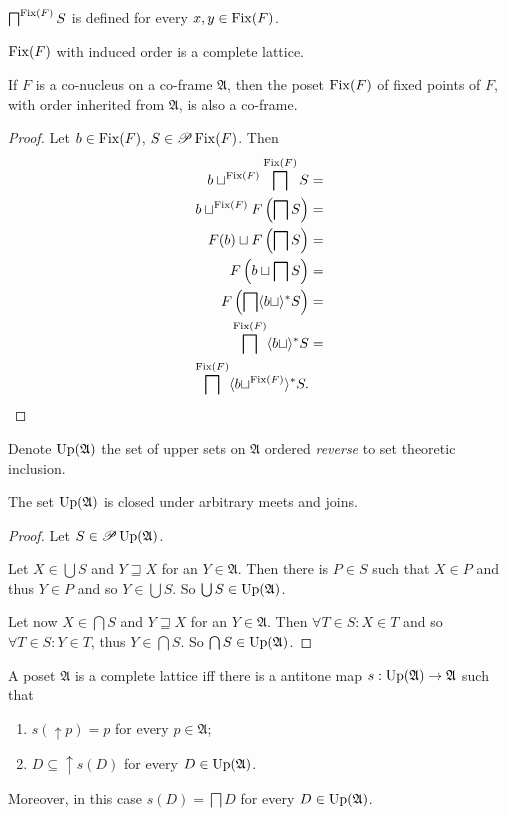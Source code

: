 \begin{cor}
$\bigsqcap^{\operatorname{Fix}(F)}S$ is defined for every $x,y\in\operatorname{Fix}(F)$.\end{cor}
\begin{obvious}
$\operatorname{Fix}(F)$ with induced order is a complete lattice.\end{obvious}
\begin{lem}
\label{fix-is-co-frame}If $F$ is a co-nucleus on a co-frame $\mathfrak{A}$,
then the poset $\operatorname{Fix}(F)$ of fixed points of $F$, with order inherited
from $\mathfrak{A}$, is also a co-frame.\end{lem}
\begin{proof}
Let $b\in\operatorname{Fix}(F)$, $S\in\mathscr{P}\operatorname{Fix}(F)$. Then 
\begin{align*}
b\sqcup^{\operatorname{Fix}(F)}\bigsqcap^{\operatorname{Fix}(F)}S & =\\
b\sqcup^{\operatorname{Fix}(F)}F\left(\bigsqcap S\right) & =\\
F(b)\sqcup F\left(\bigsqcap S\right) & =\\
F\left(b\sqcup\bigsqcap S\right) & =\\
F\left(\bigsqcap\langle b\sqcup\rangle^{\ast}S\right) & =\\
\bigsqcap^{\operatorname{Fix}(F)}\langle b\sqcup\rangle^{\ast}S & =\\
\bigsqcap^{\operatorname{Fix}(F)}\langle b\sqcup^{\operatorname{Fix}(F)}\rangle^{\ast}S.
\end{align*}
\end{proof}
\begin{defn}
Denote $\operatorname{Up}(\mathfrak{A})$ the set of upper sets on $\mathfrak{A}$
ordered \emph{reverse} to set theoretic inclusion.\end{defn}
\begin{lem}
The set $\operatorname{Up}(\mathfrak{A})$ is closed under arbitrary meets and
joins.\end{lem}
\begin{proof}
Let $S\in\mathscr{P}\operatorname{Up}(\mathfrak{A})$.

Let $X\in\bigcup S$ and $Y\sqsupseteq X$ for an $Y\in\mathfrak{A}$.
Then there is $P\in S$ such that $X\in P$ and thus $Y\in P$ and
so $Y\in\bigcup S$. So $\bigcup S\in\operatorname{Up}(\mathfrak{A})$.

Let now $X\in\bigcap S$ and $Y\sqsupseteq X$ for an $Y\in\mathfrak{A}$.
Then $\forall T\in S:X\in T$ and so $\forall T\in S:Y\in T$, thus
$Y\in\bigcap S$. So $\bigcap S\in\operatorname{Up}(\mathfrak{A})$.\end{proof}
\begin{thm}
\label{compl-via-down}A poset $\mathfrak{A}$ is a complete lattice
iff there is a antitone map $s:\operatorname{Up}(\mathfrak{A})\rightarrow\mathfrak{A}$
such that
\begin{enumerate}
\item $s(\uparrow p)=p$ for every $p\in\mathfrak{A}$;
\item $D\subseteq\uparrow s(D)$ for every $D\in\operatorname{Up}(\mathfrak{A})$.
\end{enumerate}
Moreover, in this case $s(D)=\bigsqcap D$ for every $D\in\operatorname{Up}(\mathfrak{A})$.\end{thm}
